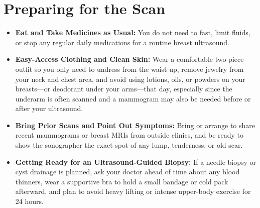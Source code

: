 \section{Preparing for the Scan}
\begin{itemize}
\item \textbf{Eat and Take Medicines as Usual:} You do not need to fast, limit fluids, or stop any regular daily medications for a routine breast ultrasound.
\item \textbf{Easy-Access Clothing and Clean Skin:} Wear a comfortable two-piece outfit so you only need to undress from the waist up, remove jewelry from your neck and chest area, and avoid using lotions, oils, or powders on your breasts---or deodorant under your arms---that day, especially since the underarm is often scanned and a mammogram may also be needed before or after your ultrasound.
\item \textbf{Bring Prior Scans and Point Out Symptoms:} Bring or arrange to share recent mammograms or breast MRIs from outside clinics, and be ready to show the sonographer the exact spot of any lump, tenderness, or old scar.
\item \textbf{Getting Ready for an Ultrasound-Guided Biopsy:} If a needle biopsy or cyst drainage is planned, ask your doctor ahead of time about any blood thinners, wear a supportive bra to hold a small bandage or cold pack afterward, and plan to avoid heavy lifting or intense upper-body exercise for 24 hours.
\end{itemize}

